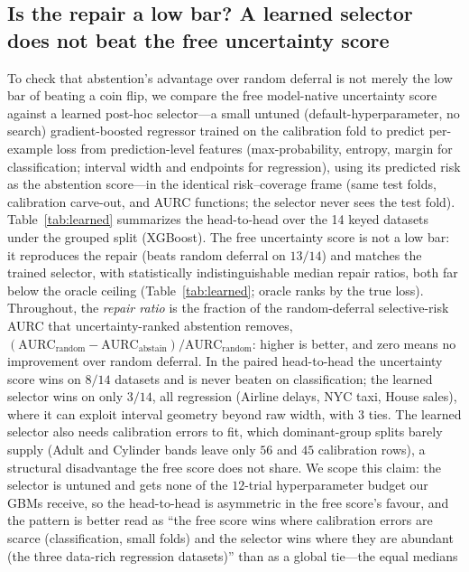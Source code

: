 \documentclass[pdflatex,sn-mathphys-num]{sn-jnl}
\begin{document}
\subsection*{Is the repair a low bar? A learned selector does not beat the free uncertainty score}
To check that abstention's advantage over random deferral is not merely the low bar of beating a coin flip, we
compare the free model-native uncertainty score against a learned post-hoc selector---a small
untuned (default-hyperparameter, no search) gradient-boosted regressor trained on the calibration fold to predict per-example loss from prediction-level
features (max-probability, entropy, margin for classification; interval width and endpoints for regression),
using its predicted risk as the abstention score---in the identical risk--coverage frame (same test folds,
calibration carve-out, and AURC functions; the selector never sees the test fold). Table~\ref{tab:learned}
summarizes the head-to-head over the 14 keyed datasets under the grouped split (XGBoost). The free uncertainty
score is not a low bar: it reproduces the repair (beats random deferral on $13/14$) and matches
the trained selector, with statistically indistinguishable median repair ratios, both far
below the oracle ceiling (Table~\ref{tab:learned}; oracle ranks by the true loss). Throughout,
the \emph{repair ratio} is the fraction of the random-deferral selective-risk AURC that
uncertainty-ranked abstention removes,
$(\mathrm{AURC}_{\mathrm{random}}-\mathrm{AURC}_{\mathrm{abstain}})/\mathrm{AURC}_{\mathrm{random}}$:
higher is better, and zero means no improvement over random deferral. In the paired head-to-head the uncertainty score
wins on $8/14$ datasets and is never beaten on classification; the learned selector wins on only $3/14$,
all regression (Airline delays, NYC taxi, House sales), where
it can exploit interval geometry beyond raw width, with $3$ ties. The learned selector also needs calibration
errors to fit, which dominant-group splits barely supply (Adult and Cylinder bands
leave only $56$ and $45$ calibration rows), a structural disadvantage the free score does not share. We scope
this claim: the selector is untuned and gets none of the $12$-trial hyperparameter budget our
GBMs receive, so the head-to-head is asymmetric in the free score's favour, and the pattern is better read as
``the free score wins where calibration errors are scarce (classification, small folds) and the selector wins
where they are abundant (the three data-rich regression datasets)'' than as a global tie---the equal medians
\end{document}
